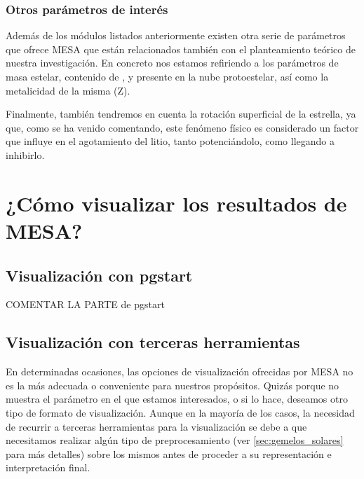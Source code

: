 \subsubsection{Otros parámetros de interés}
Además de los módulos listados anteriormente existen otra serie de parámetros que ofrece MESA que están relacionados también con el planteamiento teórico de nuestra investigación. En concreto nos estamos refiriendo a los parámetros de masa estelar, contenido de ,  y  presente en la nube protoestelar, así como la metalicidad de la misma (Z).\par

Finalmente, también tendremos en cuenta la rotación superficial de la estrella, ya que, como se ha venido comentando, este fenómeno físico es considerado un factor que influye en el agotamiento del litio, tanto potenciándolo, como llegando a inhibirlo.\par

\section{¿Cómo visualizar los resultados de MESA?}
\subsection{Visualización con pgstart}
COMENTAR LA PARTE de pgstart


\subsection{Visualización con terceras herramientas}
En determinadas ocasiones, las opciones de visualización ofrecidas por MESA no es la más adecuada o conveniente para nuestros propósitos. Quizás porque no muestra el parámetro en el que estamos interesados, o si lo hace, deseamos otro tipo de formato de visualización. Aunque en la mayoría de los casos, la necesidad de recurrir a terceras herramientas para la visualización se debe a que necesitamos realizar algún tipo de preprocesamiento (ver \ref{sec:gemelos_solares} para más detalles) sobre los mismos antes de proceder a su representación e interpretación final.\par


